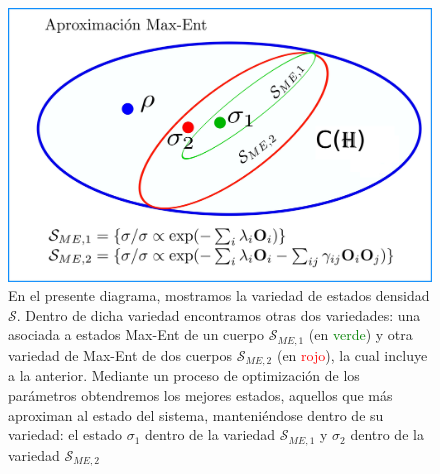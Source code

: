 \documentclass{report} %
\numberwithin{equation}{section}
\begin{document}
\begin{figure}
    \centering
    \includegraphics[scale=0.2]{figs/aprox-ME1_page-0001.jpg}
    \caption{En el presente diagrama, mostramos la variedad de estados densidad $\mathcal{S}$. Dentro de dicha variedad encontramos otras dos variedades: una asociada a estados Max-Ent de un cuerpo $\mathcal{S}_{ME,1}$ (en \textcolor{green}{verde}) y otra variedad de Max-Ent de dos cuerpos $\mathcal{S}_{ME,2}$ (en \textcolor{red}{rojo}), la cual incluye a la anterior. Mediante un proceso de optimización de los parámetros obtendremos los mejores estados, aquellos que más aproximan al estado del sistema, manteniéndose dentro de su variedad: el estado $\sigma_1$ dentro de la variedad $\mathcal{S}_{ME,1}$ y $\sigma_2$ dentro de la variedad $\mathcal{S}_{ME,2}$  }
    \label{aprox-ME1_page-0001.jpg}
\end{figure}
\end{document}
